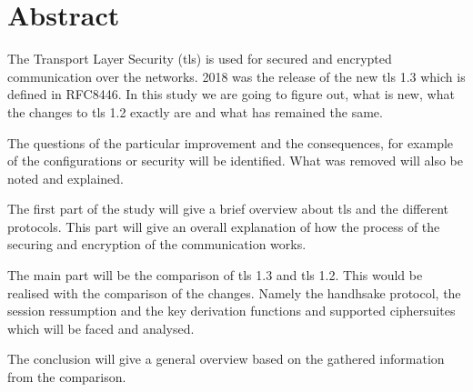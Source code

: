 \chapter*{Abstract}
\label{chap:abstract}
The Transport Layer Security (\gls{tls}) is used for secured and encrypted communication over the networks. 2018 was the release of the new \gls{tls} 1.3 which is defined in RFC8446. In this study we are going to figure out, what is new, what the changes to \gls{tls} 1.2 exactly are and what has remained the same. 

The questions of the particular improvement and the consequences, for example of the configurations or security will be identified. What was removed will also be noted and explained.

The first part of the study will give a brief overview about \gls{tls} and the different protocols. This part will give an overall explanation of how the process of the securing and encryption of the communication works. 

The main part will be the comparison of \gls{tls} 1.3 and \gls{tls} 1.2. This would be realised with the comparison of the changes. Namely the handhsake protocol, the session ressumption and the key derivation functions and supported ciphersuites which will be faced and analysed.

The conclusion will give a general overview based on the gathered information from the comparison.




